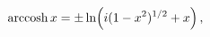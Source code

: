 \[\mathop{\mathrm{arccosh}\/}\nolimits x=\pm\mathop{\ln\/}\nolimits\!\left(i(1-x%
^{2})^{1/2}+x\right),\]